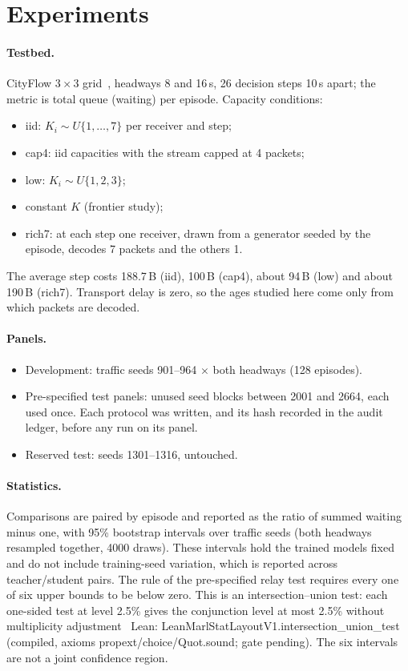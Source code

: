 \documentclass[11pt]{article}
\theoremstyle{definition}
\newcommand{\LEANC}[1]{\textsf{\footnotesize Lean: #1 (compiled, axioms propext/choice/Quot.sound; gate pending)}}
\begin{document}
\section{Experiments}\label{sec:exp}
\paragraph{Testbed.} CityFlow $3\times3$ grid~\cite{cityflow}, headways 8 and 16\,s, 26 decision steps 10\,s apart; the metric
is total queue (waiting) per episode. Capacity conditions:
\begin{itemize}
\item iid: $K_i\sim U\{1,\dots,7\}$ per receiver and step;
\item cap4: iid capacities with the stream capped at 4 packets;
\item low: $K_i\sim U\{1,2,3\}$;
\item constant $K$ (frontier study);
\item rich7: at each step one receiver, drawn from a generator seeded by the episode, decodes 7 packets and the others 1.
\end{itemize}
The average step costs 188.7\,B (iid), 100\,B (cap4), about 94\,B (low) and about 190\,B (rich7). Transport delay is zero,
so the ages studied here come only from which packets are decoded.
\paragraph{Panels.}
\begin{itemize}
\item Development: traffic seeds 901--964 $\times$ both headways (128 episodes).
\item Pre-specified test panels: unused seed blocks between 2001 and 2664, each used once. Each protocol was written, and
its hash recorded in the audit ledger, before any run on its panel.
\item Reserved test: seeds 1301--1316, untouched.
\end{itemize}
\paragraph{Statistics.} Comparisons are paired by episode and reported as the ratio of summed waiting minus one, with 95\%
bootstrap intervals over traffic seeds (both headways resampled together, 4000 draws). These intervals hold the trained
models fixed and do not include training-seed variation, which is reported across teacher/student pairs. The rule of the
pre-specified relay test requires every one of six upper bounds to be below zero. This is an intersection--union test:
each one-sided test at level 2.5\% gives the conjunction level at most 2.5\% without multiplicity
adjustment~\cite{berger1982} \LEANC{LeanMarlStatLayoutV1.intersection\_union\_test}. The six intervals are not a joint
confidence region.
\end{document}
